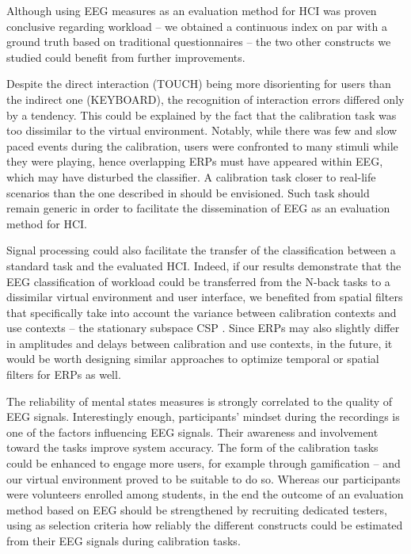 \documentclass[]{sigchi}
\begin{document}
Although using EEG measures as an evaluation method for HCI was proven
conclusive regarding workload -- we obtained a continuous index on par
with a ground truth based on traditional questionnaires -- the two other
constructs we studied could benefit from further improvements.

Despite the direct interaction (TOUCH) being more disorienting for users
than the indirect one (KEYBOARD), the recognition of interaction errors
differed only by a tendency. This could be explained by the fact that
the calibration task was too dissimilar to the virtual environment.
Notably, while there was few and slow paced events during the
calibration, users were confronted to many stimuli while they were
playing, hence overlapping ERPs must have appeared within EEG, which may
have disturbed the classifier. A calibration task closer to real-life
scenarios than the one described in \citep{Ferrez2008} should be
envisioned. Such task should remain generic in order to facilitate the
dissemination of EEG as an evaluation method for HCI.

Signal processing could also facilitate the transfer of the
classification between a standard task and the evaluated HCI. Indeed, if
our results demonstrate that the EEG classification of workload could be
transferred from the N-back tasks to a dissimilar virtual environment
and user interface, we benefited from spatial filters that specifically
take into account the variance between calibration contexts and use
contexts -- the stationary subspace CSP \citep{Wobrock2015}. Since ERPs
may also slightly differ in amplitudes and delays between calibration
and use contexts, in the future, it would be worth designing similar
approaches to optimize temporal or spatial filters for ERPs as well.

The reliability of mental states measures is strongly correlated to the
quality of EEG signals. Interestingly enough, participants' mindset
during the recordings is one of the factors influencing EEG signals.
Their awareness and involvement toward the tasks improve system
accuracy. The form of the calibration tasks could be enhanced to engage
more users, for example through gamification \citep{Flatla2011} -- and
our virtual environment proved to be suitable to do so. Whereas our
participants were volunteers enrolled among students, in the end the
outcome of an evaluation method based on EEG should be strengthened by
recruiting dedicated testers, using as selection criteria how reliably
the different constructs could be estimated from their EEG signals
during calibration tasks.
\end{document}
